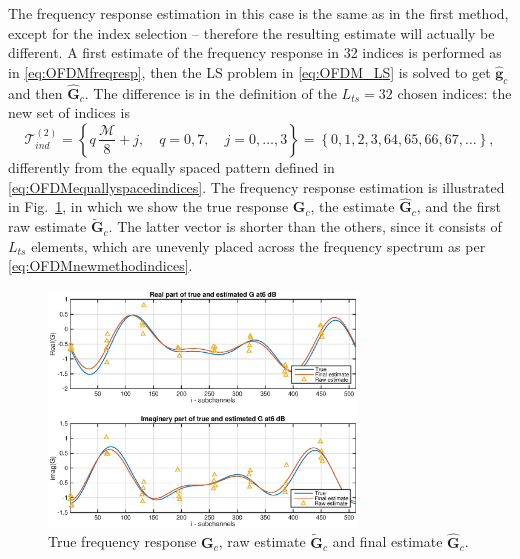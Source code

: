 \documentclass[10pt]{article}
\newcommand{\ofdM} {\mathcal{M}}
\begin{document}
The frequency response estimation in this case is the same as in the first method, except for the index selection -- therefore the resulting estimate will actually be different. A first estimate of the frequency response in 32 indices is performed as in \eqref{eq:OFDMfreqresp}, then the LS problem in \eqref{eq:OFDM_LS} is solved to get $\mathbf{\hat{g}}_c$ and then $\mathbf{\hat{G}}_c$. The difference is in the definition of the $L_{ts}\!=\!32$ chosen indices: the new set of indices is
\begin{equation}
	\mathcal{T}_{ind}^{(2)} = \left\{q \, \frac{\ofdM}{8} + j, \quad q = 0,7, \quad j=0,\ldots,3 \right\}  = \left\{ 0, 1, 2, 3, 64, 65, 66, 67, \dots \right\},
	\label{eq:OFDMnewmethodindices}
\end{equation}
differently from the equally spaced pattern defined in \eqref{eq:OFDMequallyspacedindices}. The frequency response estimation is illustrated in Fig.~\ref{fig:p3_newmethodexample}, in which we show the true response $\mathbf{G}_c$, the estimate $\mathbf{\hat{G}}_c$, and the first raw estimate $\mathbf{\tilde{G}}_c$. The latter vector is shorter than the others, since it consists of $L_{ts}$ elements, which are unevenly placed across the frequency spectrum as per \eqref{eq:OFDMnewmethodindices}.

\begin{figure}
	\centering
	\includegraphics[width = 0.73\textwidth]{p3_newmethodexample}
	\caption{True frequency response $\mathbf{G}_c$, raw estimate $\mathbf{\tilde{G}}_c$ and final estimate $\mathbf{\hat{G}}_c$.}
	\label{fig:p3_newmethodexample}
\end{figure}
\end{document}
